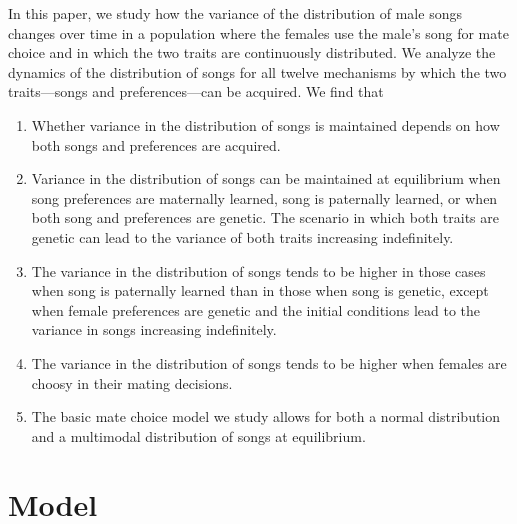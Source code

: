 \documentclass[12pt]{article}
\begin{document}
In this paper, we study how the variance of the distribution of male songs changes over time in a population where the females use the male's song for mate choice and in which the two traits are continuously distributed. We analyze the dynamics of the distribution of songs for all twelve mechanisms by which the two traits---songs and preferences---can be acquired. 
We find that 
\begin{enumerate}
\item Whether variance in the distribution of songs is maintained depends on how both songs and preferences are acquired. 
\item Variance in the distribution of songs can be maintained at equilibrium when song preferences are maternally learned, song is paternally learned, or when both song and preferences are genetic. The scenario in which both traits are genetic can lead to the variance of both traits increasing indefinitely.
\item The variance in the distribution of songs tends to be higher in those cases when song is paternally learned than in those when song is genetic, except when female preferences are genetic and the initial conditions lead to the variance in songs increasing indefinitely.
\item The variance in the distribution of songs tends to be higher when females are choosy in their mating decisions.
\item The basic mate choice model we study allows for both a normal distribution and a multimodal distribution of songs at equilibrium.
\end{enumerate}

\section*{Model}
\end{document}
